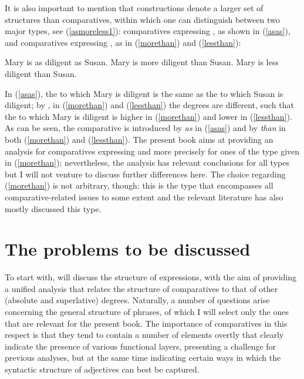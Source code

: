 It is also important to mention that  constructions denote a larger set of structures than comparatives, within which one can distinguish between two major types, see (\ref{asmoreless1}): comparatives expressing , as shown in (\ref{asas}), and comparatives expressing , as in (\ref{morethan}) and (\ref{lessthan}):

\ea \label{asmoreless1}
\ea Mary is as diligent as Susan. \label{asas}
\ex	Mary is more diligent than Susan. \label{morethan}
\ex	Mary is less diligent than Susan. \label{lessthan}
\z
\z

In (\ref{asas}), the  to which Mary is diligent is the same as the  to which Susan is diligent; by , in (\ref{morethan}) and (\ref{lessthan}) the degrees are different, such that the  to which Mary is diligent is higher in (\ref{morethan}) and lower in (\ref{lessthan}). As can be seen, the comparative  is introduced by \textit{as} in (\ref{asas}) and by \textit{than} in both (\ref{morethan}) and (\ref{lessthan}). The present book aims at providing an analysis for comparatives expressing  and more precisely for ones of the type given in (\ref{morethan}); nevertheless, the analysis has relevant conclusions for all types but I will not venture to discuss further differences here. The choice regarding (\ref{morethan}) is not arbitrary, though: this is the type that encompasses all comparative-related issues to some extent and the relevant literature has also mostly discussed this type.

\section{The problems to be discussed} \label{sec:1problems}
To start with,  will discuss the structure of  expressions, with the aim of providing a unified analysis that relates the structure of comparatives to that of other (absolute and superlative) degrees. Naturally, a number of questions arise concerning the general structure of  phrases, of which I will select only the ones that are relevant for the present book. The importance of comparatives in this respect is that they tend to contain a number of elements overtly that clearly indicate the presence of various functional layers, presenting a challenge for previous analyses, but at the same time indicating certain ways in which the syntactic structure of  adjectives can best be captured.

